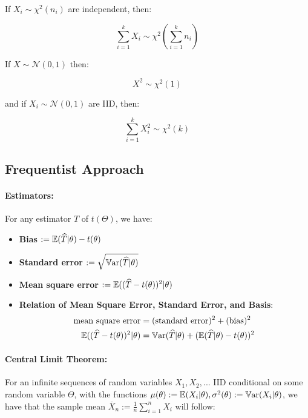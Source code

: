 \documentclass[a4paper]{article}
\begin{document}
                If $X_i \sim \chi^2(n_i)$ are independent, then:

                \[
                    \sum_{i=1}^k X_i \sim \chi^2\left(\sum_{i=1}^k n_i\right)
                \]

                If $X \sim \mathcal{N}(0, 1)$ then:

                \[
                    X^2 \sim \chi^2(1)
                \]

                and if $X_i \sim \mathcal{N}(0, 1)$ are IID, then:

                \[
                    \sum_{i=1}^k X_i^2 \sim \chi^2(k)
                \]

        \subsection*{Frequentist Approach}
            \paragraph{Estimators:}
                For any estimator $\widehat T$ of $t(\Theta)$, we have:
                \begin{itemize}
                    \item \textbf{Bias} $:= \mathbb{E}(\widehat T | \theta) - t(\theta)$
                    \item \textbf{Standard error} $:= \sqrt{\mathbb{V}\text{ar}(\widehat T |
                        \theta)}$
                    \item \textbf{Mean square error} $:= \mathbb{E}((\widehat T -
                        t(\theta))^2 | \theta)$
                    \item \textbf{Relation of Mean Square Error, Standard Error,
                        and Basis}:
                        \begin{align*}
                            \text{mean square error} & =
                                (\text{standard error})^2 + (\text{bias})^2 \\
                            \mathbb{E}((\widehat T - t(\theta))^2 | \theta) & = \mathbb{V}\text{ar}(
                                \widehat T | \theta) + (\mathbb{E}(\widehat T | \theta)
                                - t(\theta))^2
                        \end{align*}
                \end{itemize}

            \paragraph{Central Limit Theorem:}
                For an infinite sequences of random variables $X_1, X_2, ...$
                IID conditional on some random variable $\Theta$, with the
                functions $\mu(\theta) := \mathbb{E}(X_i | \theta), \sigma^2(\theta) :=
                \mathbb{V}\text{ar}(X_i | \theta)$, we have that the sample mean $\overline X_n
                := \frac{1}{n} \sum\limits_{i=1}^n X_i$ will follow:
\end{document}
